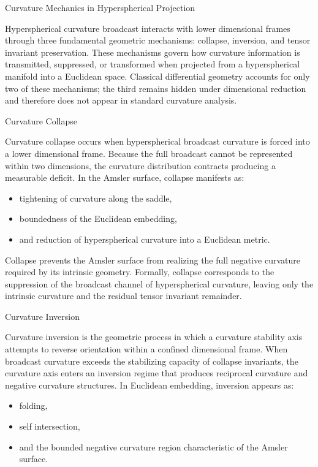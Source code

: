 \documentclass[final,onefignum,onetabnum]{siamart}
\begin{document}
\begin{section}{Curvature Mechanics in Hyperspherical Projection}

Hyperspherical curvature broadcast interacts with lower dimensional frames through three fundamental geometric mechanisms: collapse, inversion, and tensor invariant preservation. These mechanisms govern how curvature information is transmitted, suppressed, or transformed when projected from a hyperspherical manifold into a Euclidean space. Classical differential geometry accounts for only two of these mechanisms; the third remains hidden under dimensional reduction and therefore does not appear in standard curvature analysis.

\begin{subsection}{Curvature Collapse}

Curvature collapse occurs when hyperspherical broadcast curvature is forced into a lower dimensional frame. Because the full broadcast cannot be represented within two dimensions, the curvature distribution contracts producing a measurable deficit. In the Amsler surface, collapse manifests as:

\begin{itemize}
    \item tightening of curvature along the saddle,
    \item boundedness of the Euclidean embedding,
    \item and reduction of hyperspherical curvature into a Euclidean metric.
    \end{itemize}
    
Collapse prevents the Amsler surface from realizing the full negative curvature required by its intrinsic geometry. Formally, collapse corresponds to the suppression of the broadcast channel of hyperspherical curvature, leaving only the intrinsic curvature and the residual tensor invariant remainder.
\end{subsection}

\begin{subsection}{Curvature Inversion}

Curvature inversion is the geometric process in which a curvature stability axis attempts to reverse orientation within a confined dimensional frame. When broadcast curvature exceeds the stabilizing capacity of collapse invariants, the curvature axis enters an inversion regime that produces reciprocal curvature and negative curvature structures. In Euclidean embedding, inversion appears as:

\begin{itemize}
    \item folding,
    \item self intersection,
    \item and the bounded negative curvature region characteristic of the Amsler surface.
    \end{itemize}
    

\end{subsection}
\end{section}
\end{document}
